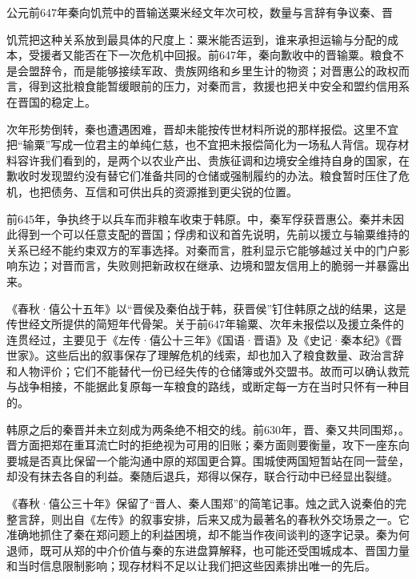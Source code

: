 \begin{event}{公元前647年}{秦向饥荒中的晋输送粟米}{经文年次可校，数量与言辞有争议}{秦、晋}

饥荒把这种关系放到最具体的尺度上：粟米能否运到，谁来承担运输与分配的成本，受援者又能否在下一次危机中回报。前647年，秦向歉收中的晋输粟。粮食不是会盟辞令，而是能够接续军政、贵族网络和乡里生计的物资；对晋惠公的政权而言，得到这批粮食能暂缓眼前的压力，对秦而言，救援也把关中安全和盟约信用系在晋国的稳定上。

次年形势倒转，秦也遭遇困难，晋却未能按传世材料所说的那样报偿。这里不宜把“输粟”写成一位君主的单纯仁慈，也不宜把未报偿简化为一场私人背信。现存材料容许我们看到的，是两个以农业产出、贵族征调和边境安全维持自身的国家，在歉收时发现盟约没有替它们准备共同的仓储或强制履约的办法。粮食暂时压住了危机，也把债务、互信和可供出兵的资源推到更尖锐的位置。
\end{event}

前645年，争执终于以兵车而非粮车收束于韩原。中，秦军俘获晋惠公。秦并未因此得到一个可以任意支配的晋国；俘虏和议和首先说明，先前以援立与输粟维持的关系已经不能约束双方的军事选择。对秦而言，胜利显示它能够越过关中的门户影响东边；对晋而言，失败则把新政权在继承、边境和盟友信用上的脆弱一并暴露出来。

\begin{textwindow}[粮食、战报与后出的完整故事]
《春秋·僖公十五年》以“晋侯及秦伯战于韩，获晋侯”钉住韩原之战的结果，这是传世经文所提供的简短年代骨架。关于前647年输粟、次年未报偿以及援立条件的连贯经过，主要见于《左传·僖公十三年》《国语·晋语》及《史记·秦本纪》《晋世家》。这些后出的叙事保存了理解危机的线索，却也加入了粮食数量、政治言辞和人物评价；它们不能替代一份已经失传的仓储簿或外交盟书。故而可以确认救荒与战争相接，不能据此复原每一车粮食的路线，或断定每一方在当时只怀有一种目的。
\end{textwindow}

韩原之后的秦晋并未立刻成为两条绝不相交的线。前630年，晋、秦又共同围郑，。晋方面把郑在重耳流亡时的拒绝视为可用的旧账；秦方面则要衡量，攻下一座东向要城是否真比保留一个能沟通中原的郑国更合算。围城使两国短暂站在同一营垒，却没有抹去各自的利益。秦随后退兵，郑得以保存，联合行动中已经显出裂缝。

《春秋·僖公三十年》保留了“晋人、秦人围郑”的简笔记事。烛之武入说秦伯的完整言辞，则出自《左传》的叙事安排，后来又成为最著名的春秋外交场景之一。它准确地抓住了秦在郑问题上的利益困境，却不能当作夜间谈判的逐字记录。秦为何退师，既可从郑的中介价值与秦的东进盘算解释，也可能还受围城成本、晋国力量和当时信息限制影响；现存材料不足以让我们把这些因素排出唯一的先后。

